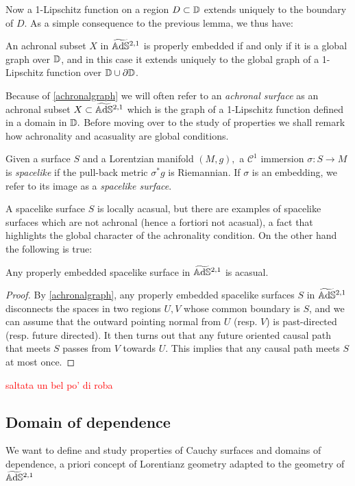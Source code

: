 Now a 1-Lipschitz function on a region $D\subset \mathbb{D}$ extends uniquely to the boundary of $D$. As a simple consequence to the previous lemma, we thus have: 

\begin{lemma}\label{achronalgraph}
    An achronal subset $X$ in $\widetilde{\mathbb{A}\mathrm{d}\mathbb{S}}{}^{2,1}$ is properly embedded if and only if it is a global graph over $\mathbb{D}$, and in this case it extends uniquely to the global graph of a 1-Lipschitz function over $\mathbb{D}\cup\partial\mathbb{D}$.
\end{lemma}

Because of \ref{achronalgraph} we will often refer to an \textit{achronal surface} as an achronal subset $X\subset\widetilde{\mathbb{A}\mathrm{d}\mathbb{S}}{}^{2,1}$ which is the graph of a 1-Lipschitz function defined in a domain in $\mathbb{D}.$ Before moving over to the study of properties we shall remark how achronality and acasuality are global conditions.

\begin{definition} Given a surface $S$ and a Lorentzian manifold $(M,g),$ a $\mathcal{C}^1$ immersion $\sigma:S\to M$ is \textit{spacelike} if the pull-back metric $\sigma^*g$ is Riemannian. If $\sigma$ is an embedding, we refer to its image as a \textit{spacelike surface}.
\end{definition}

A spacelike surface $S$ is locally acasual, but there are examples of spacelike surfaces which are not achronal (hence a fortiori not acasual), a fact that highlights the global character of the achronality condition. On the other hand the following is true: 

\begin{lemma}
    Any properly embedded spacelike surface in $\widetilde{\mathbb{A}\mathrm{d}\mathbb{S}}{}^{2,1}$ is acasual. 
\end{lemma}
\begin{proof}
    By \ref{achronalgraph}, any properly embedded spacelike surfaces $S$ in $\widetilde{\mathbb{A}\mathrm{d}\mathbb{S}}{}^{2,1}$ disconnects the spaces in two regions $U,V$ whose common boundary is $S$, and we can assume that the outward pointing normal from $U$ (resp. $V$) is past-directed (resp. future directed). It then turns out that any future oriented causal path that meets $S$ passes from $V$ towards $U$. This implies that any causal path meets $S$ at most once. 
\end{proof}

\textcolor{red}{saltata un bel po' di roba}

\subsection{Domain of dependence}
We want to define and study properties of Cauchy surfaces and domains of dependence, a priori concept of Lorentianz geometry adapted to the geometry of $\widetilde{\mathbb{A}\mathrm{d}\mathbb{S}}{}^{2,1}$

